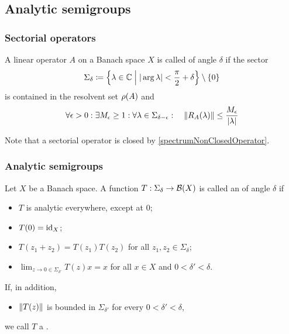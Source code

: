 \subsection{Analytic semigroups}
\subsubsection{Sectorial operators}
\begin{definition}
A linear operator $A$ on a Banach space $X$ is called  of angle $\delta$ if the sector
\[ \Sigma_\delta \coloneqq \left\{ \lambda\in\mathbb{C} \;\middle|\; |\arg\lambda| < \frac{\pi}{2}+\delta \right\}\setminus \{0\} \]
is contained in the resolvent set $\rho(A)$ and
\[ \forall \epsilon >0: \exists M_\epsilon \geq 1: \forall \lambda\in \Sigma_{\delta-\epsilon}: \quad \lVert R_A(\lambda)\rVert \leq \frac{M_\epsilon}{|\lambda|} \]
\end{definition}
Note that a sectorial operator is closed by \ref{spectrumNonClosedOperator}.

\subsubsection{Analytic semigroups}
\begin{definition}
Let $X$ be a Banach space. A function $T: \Sigma_\delta \to \operatorname{\mathcal{B}}(X)$ is called an  of angle $\delta$ if
\begin{itemize}
\item $T$ is analytic everywhere, except at $0$;
\item $T(0) = \operatorname{id}_X$;
\item $T(z_1 + z_2) = T(z_1)T(z_2)$ for all $z_1,z_2\in \Sigma_\delta$;
\item $\lim_{z\to 0 \in \Sigma_{\delta'}}T(z)x = x$ for all $x\in X$ and $0<\delta'<\delta$.
\end{itemize}
If, in addition,
\begin{itemize}
\item $\lVert T(z)\rVert$ is bounded in $\Sigma_{\delta'}$ for every $0<\delta'<\delta$,
\end{itemize}
we call $T$ a .
\end{definition}

